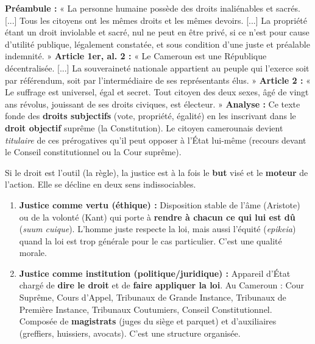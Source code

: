 \documentclass[11pt]{article}
\newcommand{\cle}[1]{{\popxbold\color{popdark}#1}}
\newcounter{popsec}
\newcounter{popsub}
\newcommand{\courssub}[1]{%
  \stepcounter{popsub}%
  \par\vspace{9pt}\noindent{\popxbold\fontsize{11.5}{13}\selectfont\color{popink}{\color{poporange}\thepopsec.\thepopsub}\hspace{6pt}#1}\par\nopagebreak\vspace{4pt}
}
\begin{document}
\begin{exemplebox}
\textbf{Préambule :} « La personne humaine possède des droits inaliénables et sacrés. [...] Tous les citoyens ont les mêmes droits et les mêmes devoirs. [...] La propriété étant un droit inviolable et sacré, nul ne peut en être privé, si ce n'est pour cause d'utilité publique, légalement constatée, et sous condition d'une juste et préalable indemnité. »
\textbf{Article 1er, al. 2 :} « Le Cameroun est une République décentralisée. [...] La souveraineté nationale appartient au peuple qui l'exerce soit par référendum, soit par l'intermédiaire de ses représentants élus. »
\textbf{Article 2 :} « Le suffrage est universel, égal et secret. Tout citoyen des deux sexes, âgé de vingt ans révolus, jouissant de ses droits civiques, est électeur. » \tcblower \textbf{Analyse :} Ce texte fonde des \textbf{droits subjectifs} (vote, propriété, égalité) en les inscrivant dans le \textbf{droit objectif} suprême (la Constitution). Le citoyen camerounais devient \emph{titulaire} de ces prérogatives qu'il peut opposer à l'État lui-même (recours devant le Conseil constitutionnel ou la Cour suprême).
\end{exemplebox}

\courssub{La justice : vertu et institution}

Si le droit est l'outil (la règle), la justice est à la fois le \textbf{but} visé et le \textbf{moteur} de l'action. Elle se décline en deux sens indissociables.

\begin{definition}
\begin{enumerate}
\item \textbf{Justice comme vertu (éthique) :} Disposition stable de l'âme (Aristote) ou de la volonté (Kant) qui porte à \textbf{rendre à chacun ce qui lui est dû} (\emph{suum cuique}). L'homme juste respecte la loi, mais aussi l'équité (\emph{epikeia}) quand la loi est trop générale pour le cas particulier. C'est une \cle{qualité morale}.
\item \textbf{Justice comme institution (politique/juridique) :} Appareil d'État chargé de \textbf{dire le droit} et de \textbf{faire appliquer la loi}. Au Cameroun : Cour Suprême, Cours d'Appel, Tribunaux de Grande Instance, Tribunaux de Première Instance, Tribunaux Coutumiers, Conseil Constitutionnel. Composée de \textbf{magistrats} (juges du siège et parquet) et d'auxiliaires (greffiers, huissiers, avocats). C'est une \cle{structure organisée}.
\end{enumerate}
\end{definition}
\end{document}
